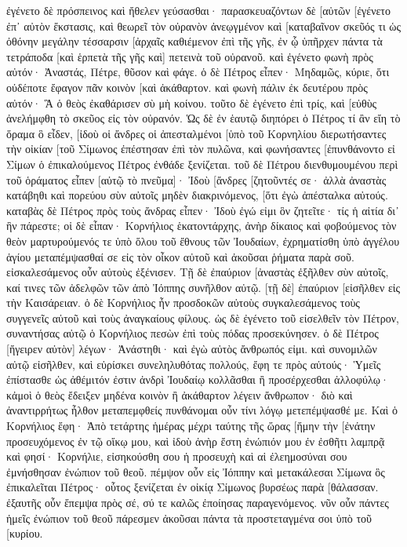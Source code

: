 ἐγένετο δὲ πρόσπεινος καὶ ἤθελεν γεύσασθαι· παρασκευαζόντων δὲ [αὐτῶν [ἐγένετο ἐπ᾽ αὐτὸν ἔκστασις, 
καὶ θεωρεῖ τὸν οὐρανὸν ἀνεῳγμένον καὶ [καταβαῖνον σκεῦός τι ὡς ὀθόνην μεγάλην τέσσαρσιν [ἀρχαῖς καθιέμενον ἐπὶ τῆς γῆς, 
ἐν ᾧ ὑπῆρχεν πάντα τὰ τετράποδα [καὶ ἑρπετὰ τῆς γῆς καὶ] πετεινὰ τοῦ οὐρανοῦ. 
καὶ ἐγένετο φωνὴ πρὸς αὐτόν· Ἀναστάς, Πέτρε, θῦσον καὶ φάγε. 
ὁ δὲ Πέτρος εἶπεν· Μηδαμῶς, κύριε, ὅτι οὐδέποτε ἔφαγον πᾶν κοινὸν [καὶ ἀκάθαρτον. 
καὶ φωνὴ πάλιν ἐκ δευτέρου πρὸς αὐτόν· Ἃ ὁ θεὸς ἐκαθάρισεν σὺ μὴ κοίνου. 
τοῦτο δὲ ἐγένετο ἐπὶ τρίς, καὶ [εὐθὺς ἀνελήμφθη τὸ σκεῦος εἰς τὸν οὐρανόν. 
Ὡς δὲ ἐν ἑαυτῷ διηπόρει ὁ Πέτρος τί ἂν εἴη τὸ ὅραμα ὃ εἶδεν, [ἰδοὺ οἱ ἄνδρες οἱ ἀπεσταλμένοι [ὑπὸ τοῦ Κορνηλίου διερωτήσαντες τὴν οἰκίαν [τοῦ Σίμωνος ἐπέστησαν ἐπὶ τὸν πυλῶνα, 
καὶ φωνήσαντες [ἐπυνθάνοντο εἰ Σίμων ὁ ἐπικαλούμενος Πέτρος ἐνθάδε ξενίζεται. 
τοῦ δὲ Πέτρου διενθυμουμένου περὶ τοῦ ὁράματος εἶπεν [αὐτῷ τὸ πνεῦμα]· Ἰδοὺ [ἄνδρες [ζητοῦντές σε· 
ἀλλὰ ἀναστὰς κατάβηθι καὶ πορεύου σὺν αὐτοῖς μηδὲν διακρινόμενος, [ὅτι ἐγὼ ἀπέσταλκα αὐτούς. 
καταβὰς δὲ Πέτρος πρὸς τοὺς ἄνδρας εἶπεν· Ἰδοὺ ἐγώ εἰμι ὃν ζητεῖτε· τίς ἡ αἰτία δι᾽ ἣν πάρεστε; 
οἱ δὲ εἶπαν· Κορνήλιος ἑκατοντάρχης, ἀνὴρ δίκαιος καὶ φοβούμενος τὸν θεὸν μαρτυρούμενός τε ὑπὸ ὅλου τοῦ ἔθνους τῶν Ἰουδαίων, ἐχρηματίσθη ὑπὸ ἀγγέλου ἁγίου μεταπέμψασθαί σε εἰς τὸν οἶκον αὐτοῦ καὶ ἀκοῦσαι ῥήματα παρὰ σοῦ. 
εἰσκαλεσάμενος οὖν αὐτοὺς ἐξένισεν. Τῇ δὲ ἐπαύριον [ἀναστὰς ἐξῆλθεν σὺν αὐτοῖς, καί τινες τῶν ἀδελφῶν τῶν ἀπὸ Ἰόππης συνῆλθον αὐτῷ. 
[τῇ δὲ] ἐπαύριον [εἰσῆλθεν εἰς τὴν Καισάρειαν. ὁ δὲ Κορνήλιος ἦν προσδοκῶν αὐτοὺς συγκαλεσάμενος τοὺς συγγενεῖς αὐτοῦ καὶ τοὺς ἀναγκαίους φίλους. 
ὡς δὲ ἐγένετο τοῦ εἰσελθεῖν τὸν Πέτρον, συναντήσας αὐτῷ ὁ Κορνήλιος πεσὼν ἐπὶ τοὺς πόδας προσεκύνησεν. 
ὁ δὲ Πέτρος [ἤγειρεν αὐτὸν] λέγων· Ἀνάστηθι· καὶ ἐγὼ αὐτὸς ἄνθρωπός εἰμι. 
καὶ συνομιλῶν αὐτῷ εἰσῆλθεν, καὶ εὑρίσκει συνεληλυθότας πολλούς, 
ἔφη τε πρὸς αὐτούς· Ὑμεῖς ἐπίστασθε ὡς ἀθέμιτόν ἐστιν ἀνδρὶ Ἰουδαίῳ κολλᾶσθαι ἢ προσέρχεσθαι ἀλλοφύλῳ· κἀμοὶ ὁ θεὸς ἔδειξεν μηδένα κοινὸν ἢ ἀκάθαρτον λέγειν ἄνθρωπον· 
διὸ καὶ ἀναντιρρήτως ἦλθον μεταπεμφθείς πυνθάνομαι οὖν τίνι λόγῳ μετεπέμψασθέ με. 
Καὶ ὁ Κορνήλιος ἔφη· Ἀπὸ τετάρτης ἡμέρας μέχρι ταύτης τῆς ὥρας [ἤμην τὴν [ἐνάτην προσευχόμενος ἐν τῷ οἴκῳ μου, καὶ ἰδοὺ ἀνὴρ ἔστη ἐνώπιόν μου ἐν ἐσθῆτι λαμπρᾷ 
καὶ φησί· Κορνήλιε, εἰσηκούσθη σου ἡ προσευχὴ καὶ αἱ ἐλεημοσύναι σου ἐμνήσθησαν ἐνώπιον τοῦ θεοῦ. 
πέμψον οὖν εἰς Ἰόππην καὶ μετακάλεσαι Σίμωνα ὃς ἐπικαλεῖται Πέτρος· οὗτος ξενίζεται ἐν οἰκίᾳ Σίμωνος βυρσέως παρὰ [θάλασσαν. 
ἐξαυτῆς οὖν ἔπεμψα πρὸς σέ, σύ τε καλῶς ἐποίησας παραγενόμενος. νῦν οὖν πάντες ἡμεῖς ἐνώπιον τοῦ θεοῦ πάρεσμεν ἀκοῦσαι πάντα τὰ προστεταγμένα σοι ὑπὸ τοῦ [κυρίου. 

